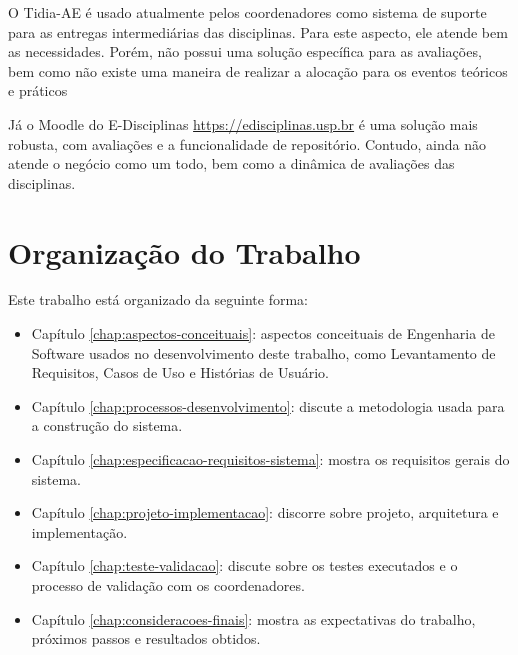 O Tidia-AE é usado atualmente pelos coordenadores como sistema de suporte para as entregas intermediárias das disciplinas. Para este aspecto, ele atende bem as necessidades. Porém, não possui uma solução específica para as avaliações, bem como não existe uma maneira de realizar a alocação para os eventos teóricos e práticos

Já o Moodle do E-Disciplinas \href{https://edisciplinas.usp.br}{https://edisciplinas.usp.br} é uma solução mais robusta, com avaliações e a funcionalidade de repositório. Contudo, ainda não atende o negócio como um todo, bem como a dinâmica de avaliações das disciplinas.

\section{Organização do Trabalho}
Este trabalho está organizado da seguinte forma:

\begin{itemize}
    \item Capítulo \ref{chap:aspectos-conceituais}: aspectos conceituais de Engenharia de Software usados no desenvolvimento deste trabalho, como Levantamento de Requisitos, Casos de Uso e Histórias de Usuário.
    \item Capítulo \ref{chap:processos-desenvolvimento}: discute a metodologia usada para a construção do sistema.
    \item Capítulo \ref{chap:especificacao-requisitos-sistema}: mostra os requisitos gerais do sistema.
    \item Capítulo \ref{chap:projeto-implementacao}: discorre sobre projeto, arquitetura e implementação.
    \item Capítulo \ref{chap:teste-validacao}: discute sobre os testes executados e o processo de validação com os coordenadores.
    \item Capítulo \ref{chap:consideracoes-finais}: mostra as expectativas do trabalho, próximos passos e resultados obtidos.
\end{itemize}
